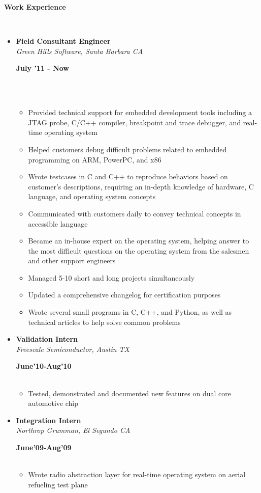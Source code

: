 \documentclass[a4paper,11pt]{article}
\newcommand{\isep}{-2 pt}
\newcommand{\lsep}{-0.5cm}
\newcommand{\resheading}[1]{{\small \colorbox{mygrey}{\begin{minipage}{0.975\textwidth}{\textbf{#1 \vphantom{p\^{E}}}}\end{minipage}}}}
\newcommand{\workexp}[4]{
\begin{minipage}[t]{7cm}
\begin{flushleft}
\textbf{#1} \\
\indent \emph{#2}\\
\end{flushleft}
\end{minipage}
\hfill
\begin{minipage}[t]{7cm}
\begin{flushright}
\textbf{#3} \\
\indent #4 \\
\end{flushright}
\end{minipage}
}
\begin{document}
\resheading{\textbf{Work Experience} }\\[\lsep]
\begin{itemize}
\item 
\workexp{Field Consultant Engineer}{Green Hills Software, Santa Barbara CA}{July '11 - Now}{}
\\[-0.2cm]
	\begin{itemize}\itemsep \isep
	\item Provided technical support for embedded development tools including a JTAG probe, C/C++ compiler, breakpoint and trace debugger, and real-time operating system
	\item Helped customers debug difficult problems related to embedded programming on ARM, PowerPC, and x86
	\item Wrote testcases in C and C++ to reproduce behaviors based on customer's descriptions, requiring an in-depth knowledge of hardware, C language, and operating system concepts
	\item Communicated with customers daily to convey technical concepts in accessible language
	\item Became an in-house expert on the operating system, helping answer to the most difficult questions on the operating system from the salesmen and other support engineers
	\item Managed 5-10 short and long  projects simultaneously
	\item Updated a comprehensive changelog for certification purposes
	\item Wrote several small programs in C, C++, and Python, as well as technical articles to help solve common problems
	\end{itemize}

\item
\workexp{Validation Intern}{Freescale Semiconductor, Austin TX}{June'10-Aug'10}{}
	\begin{itemize}\itemsep \isep
	\item Tested, demonstrated and documented new features on dual core automotive chip
	\end{itemize}
\item
\workexp{Integration Intern}{Northrop Grumman, El Segundo CA}{June'09-Aug'09}{}
	\begin{itemize}\itemsep \isep
	\item Wrote radio abstraction layer for real-time operating system on aerial refueling test plane
	\end{itemize}
\end{itemize}
\end{document}
